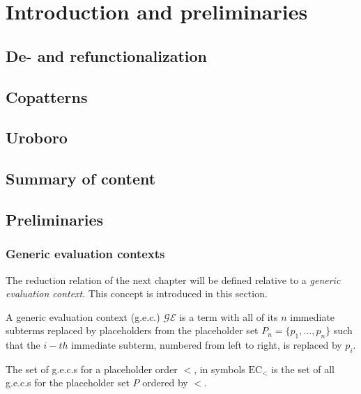 \chapter{Introduction and preliminaries}

\section{De- and refunctionalization}

\section{Copatterns}

\section{Uroboro}

\section{Summary of content}

\section{Preliminaries}

\subsection{Generic evaluation contexts}

The reduction relation of the next chapter will be defined relative to a \textit{generic evaluation context}. This concept is introduced in this section.

\begin{definition}
A generic evaluation context (g.e.c.) $\mathcal{GE}$ is a term with all of its $n$ immediate subterms replaced by placeholders from the placeholder set $P_n = \{p_1, ..., p_n\}$ such that the $i-th$ immediate subterm, numbered from left to right, is replaced by $p_i$.
\end{definition}

\begin{definition}
The set of g.e.c.s for a placeholder order $<$, in symbols $\textrm{EC}_<$ is the set of all g.e.c.s for the placeholder set $P$ ordered by $<$.
\end{definition}

